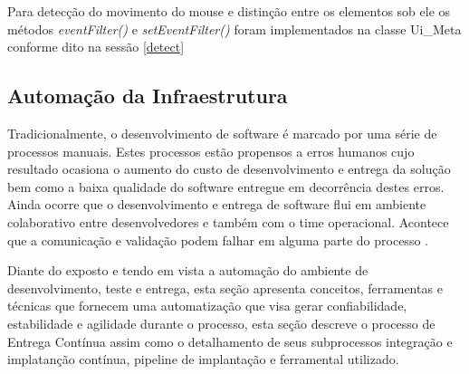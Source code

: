 Para detecção do movimento do mouse e distinção entre os elementos sob ele os métodos \textit{eventFilter()} e \textit{setEventFilter()} foram implementados na classe Ui\_Meta conforme dito na sessão \ref{detect}



\subsection{Automação da Infraestrutura}


Tradicionalmente, o desenvolvimento de software é marcado por uma série de processos manuais. Estes processos estão propensos a erros humanos cujo resultado ocasiona o aumento do custo de desenvolvimento e entrega da solução bem como a baixa qualidade do software entregue em decorrência destes erros. Ainda ocorre que o desenvolvimento e entrega de software flui em ambiente colaborativo entre desenvolvedores e também com o time operacional. Acontece que a comunicação e validação podem falhar em alguma parte do processo \cite{braga2015devops}. 

Diante do exposto e tendo em vista a automação do ambiente de desenvolvimento, teste e entrega, esta seção apresenta conceitos, ferramentas e técnicas que fornecem uma automatização que visa gerar confiabilidade, estabilidade e agilidade durante o processo, esta seção descreve o processo de Entrega Contínua assim como o detalhamento de seus subprocessos integração e implatanção contínua, pipeline de implantação e ferramental utilizado.




